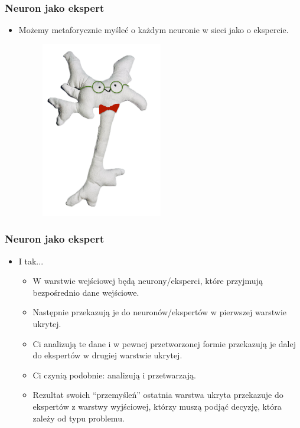 \documentclass{beamer}
\begin{document}
\begin{frame}[fragile]
\frametitle{Neuron jako ekspert}
\begin{itemize}
\item Możemy metaforycznie myśleć o każdym neuronie w sieci jako o ekspercie.

                    \begin{figure}[h]
                        \centering
                        \includegraphics[width=0.5\textwidth]{../../img/neuron_ekspert.png}
                    \end{figure}                    
                    \end{itemize}
\end{frame}

\begin{frame}[fragile]
\frametitle{Neuron jako ekspert}
\begin{itemize}
\item I tak...
	\begin{itemize}
	\item W warstwie wejściowej będą neurony/eksperci, które przyjmują bezpośrednio dane wejściowe.
	\item Następnie przekazują je do neuronów/ekspertów w pierwszej warstwie ukrytej.
	\item Ci analizują te dane i w pewnej przetworzonej formie przekazują je dalej do ekspertów w drugiej warstwie ukrytej.
	\item Ci czynią podobnie: analizują i przetwarzają.
	\item Rezultat swoich “przemyśleń” ostatnia warstwa ukryta przekazuje do ekspertów z warstwy wyjściowej, którzy muszą podjąć decyzję, która zależy od typu problemu.
	\end{itemize}
\end{itemize}

\end{frame}
\end{document}
